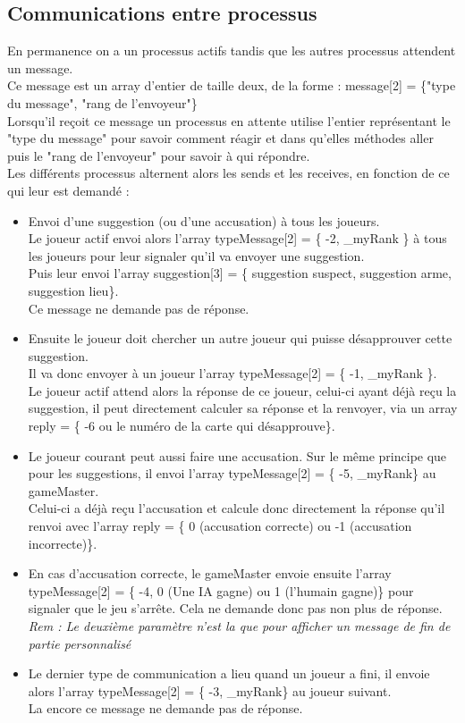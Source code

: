 \documentclass[a4paper,10pt]{article}
\begin{document}
	\subsection{Communications entre processus}
		En permanence on a un processus actifs tandis que les autres processus attendent un message.\\
		Ce message est un array d'entier de taille deux, de la forme : message[2] = \{"type du message", "rang de l'envoyeur"\}\\
		Lorsqu'il reçoit ce message un processus en attente utilise l'entier représentant le "type du message" pour savoir comment réagir et dans qu'elles méthodes aller puis le "rang de l'envoyeur" pour savoir à qui répondre.\\
		Les différents processus alternent alors les sends et les receives, en fonction de ce qui leur est demandé :
		\begin{itemize}
			\item Envoi d'une suggestion (ou d'une accusation) à tous les joueurs.\\
					Le joueur actif envoi alors l'array typeMessage[2] = \{ -2, \_myRank \} à tous les joueurs pour leur signaler qu'il va envoyer une suggestion.\\
					Puis leur envoi l'array suggestion[3] = \{ suggestion suspect, suggestion arme, suggestion lieu\}.\\
					Ce message ne demande pas de réponse.
			\item Ensuite le joueur doit chercher un autre joueur qui puisse désapprouver cette suggestion.\\
					Il va donc envoyer à un joueur l'array typeMessage[2] = \{ -1, \_myRank \}.\\
					Le joueur actif attend alors la réponse de ce joueur, celui-ci ayant déjà reçu la suggestion, il peut directement calculer sa réponse et la renvoyer, via un array reply = \{ -6 ou le numéro de la carte qui désapprouve\}.
			\item Le joueur courant peut aussi faire une accusation. Sur le même principe que pour les suggestions, il envoi l'array typeMessage[2] = \{ -5, \_myRank\} au gameMaster.\\
				Celui-ci a déjà reçu l'accusation et calcule donc directement la réponse qu'il renvoi avec l'array reply = \{ 0 (accusation correcte) ou -1 (accusation incorrecte)\}.
			\item En cas d'accusation correcte, le gameMaster envoie ensuite l'array typeMessage[2] = \{ -4, 0 (Une IA gagne) ou 1 (l'humain gagne)\} pour signaler que le jeu s’arrête. Cela ne demande donc pas non plus de réponse.\\
			\textit{Rem : Le deuxième paramètre n'est la que pour afficher un message de fin de partie personnalisé}
			\item Le dernier type de communication a lieu quand un joueur a fini, il envoie alors l'array typeMessage[2] = \{ -3, \_myRank\} au joueur suivant.\\
			La encore ce message ne demande pas de réponse.		
		\end{itemize}
\end{document}
